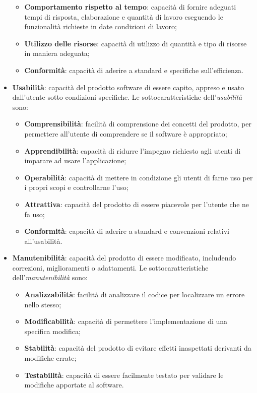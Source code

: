 \begin{itemize}
	\begin{itemize}
	\item \textbf{Comportamento rispetto al tempo}: capacità di fornire adeguati tempi di risposta, elaborazione e quantità di lavoro eseguendo le funzionalità richieste in date condizioni di lavoro;
	\item \textbf{Utilizzo delle risorse}: capacità di utilizzo di quantità e tipo di risorse in maniera adeguata;
	\item \textbf{Conformità}: capacità di aderire a standard e specifiche sull'efficienza.
	\end{itemize}
\item \textbf{Usabilità}: capacità del prodotto software di essere capito, appreso e usato dall'utente sotto condizioni specifiche. Le sottocaratteristiche dell'\textit{usabilità} sono:
	\begin{itemize}
	\item \textbf{Comprensibilità}: facilità di comprensione dei concetti del prodotto, per permettere all'utente di comprendere se il software è appropriato;
	\item \textbf{Apprendibilità}: capacità di ridurre l'impegno richiesto agli utenti di imparare ad usare l'applicazione;
	\item \textbf{Operabilità}: capacità di mettere in condizione gli utenti di farne uso per i propri scopi e controllarne l'uso;
	\item \textbf{Attrattiva}: capacità del prodotto di essere piacevole per l'utente che ne fa uso;
	\item \textbf{Conformità}: capacità di aderire a standard e convenzioni relativi all'usabilità.
	\end{itemize}
\item \textbf{Manutenibilità}: capacità del prodotto di essere modificato, includendo correzioni, miglioramenti o adattamenti. Le sottocaratteristiche dell'\textit{manutenibilità} sono:
	\begin{itemize}
	\item \textbf{Analizzabilità}: facilità di analizzare il codice per localizzare un errore nello stesso;
	\item \textbf{Modificabilità}: capacità di permettere l'implementazione di una specifica modifica;
	\item \textbf{Stabilità}: capacità del prodotto di evitare effetti inaspettati derivanti da modifiche errate;
	\item \textbf{Testabilità}: capacità di essere facilmente testato per validare le modifiche apportate al software.

\end{itemize}
\end{itemize}
